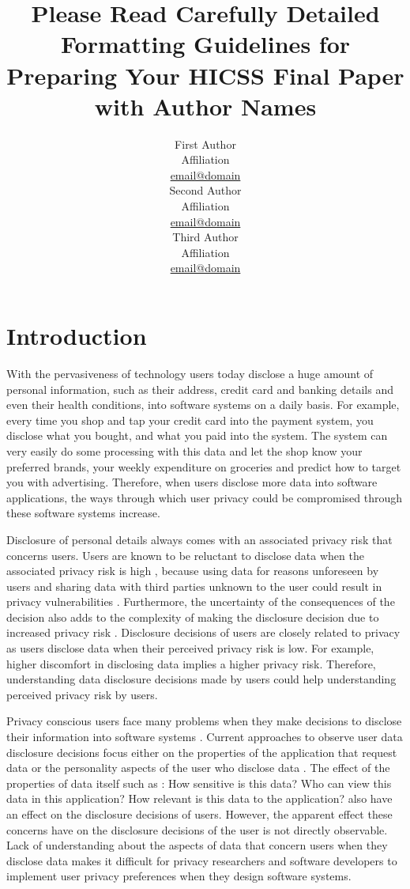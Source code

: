 \documentclass[10pt]{article}
\title{Please Read Carefully Detailed Formatting Guidelines for Preparing Your HICSS Final Paper with Author Names}
\author{First Author \\
  Affiliation \\
  {\underline{ email@domain}} \\\And
  Second Author \\
  Affiliation \\
  {\underline{ email@domain} }\\\And 
  Third Author \\
  Affiliation \\
  {\underline{email@domain}} \\}
\date{}
\begin{document}
\maketitle
\begin{abstract}


\end{abstract}

\section{Introduction}
With the pervasiveness of technology users today disclose a huge amount of personal information, such as their address, credit card and banking details and even their health conditions, into software systems on a daily basis. For example, every time you shop and tap your credit card into the payment system, you disclose what you bought, and what you paid into the system. The system can very easily do some processing with this data and let the shop know your preferred brands, your weekly expenditure on groceries and predict how to target you with advertising. Therefore, when users disclose more data into software applications, the ways through which user privacy could be compromised through these software systems increase. 

Disclosure of personal details always comes with an associated privacy risk that concerns users. Users are known to be reluctant to disclose data when the associated privacy risk is high \cite {kobsa2007privacy}, because using data for reasons unforeseen by users and sharing data with third parties unknown to the user could result in privacy vulnerabilities \cite {malhotra2004internet}. Furthermore, the uncertainty of the consequences of the decision also adds to the complexity of making the disclosure decision due to increased privacy risk \cite {knijnenburg2013helping}. Disclosure decisions of users are closely related to privacy as users disclose data when their perceived privacy risk is low. For example, higher discomfort in disclosing data implies a higher privacy risk. Therefore, understanding data disclosure decisions made by users could help understanding perceived privacy risk by users.


Privacy conscious users face many problems when they make decisions to disclose their information into software systems \cite {li2010understanding}. Current approaches to observe user data disclosure decisions focus either on the properties of the application that request data \cite {li2010understanding, wang2016context, malheiros2013fairly} or the personality aspects of the user who disclose data \cite {nissenbaum2009privacy}. The effect of the properties of data itself such as : How sensitive is this data? Who can view this data in this application? How relevant is this data to the application? also have an effect on the disclosure decisions of users. However, the apparent effect these concerns have on the disclosure decisions of the user is not directly observable. Lack of understanding about the aspects of data that concern users when they disclose data makes it difficult for privacy researchers and software developers to implement user privacy preferences when they design software systems. 
\end{document}
